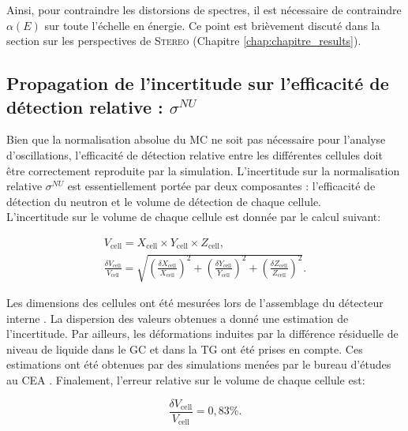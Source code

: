 \bigbreak

Ainsi, pour contraindre les distorsions de spectres, il est nécessaire de contraindre $\alpha (E)$ sur toute l'échelle en énergie. Ce point est brièvement discuté dans la section sur les perspectives de \textsc{Stereo} (Chapitre \ref{chap:chapitre_results}).

\bigbreak

\subsection{Propagation de l'incertitude sur l'efficacité de détection relative : $\sigma^{NU}$}

Bien que la normalisation absolue du MC ne soit pas nécessaire pour l'analyse d'oscillations, l'efficacité de détection relative entre les différentes cellules doit être correctement reproduite par la simulation. L'incertitude sur la normalisation relative $\sigma^{NU}$ est essentiellement portée par deux composantes : l'efficacité de détection du neutron et le volume de détection de chaque cellule.\\

L'incertitude sur le volume de chaque cellule est donnée par le calcul suivant:

\begin{equation}
\begin{gathered}
    V_\textrm{cell} = X_\textrm{cell} \times Y_\textrm{cell} \times Z_\textrm{cell},\\
    \frac{\delta V_\textrm{cell}}{V_\textrm{cell}} = \sqrt{\left(\frac{\delta X_\textrm{cell}}{X_\textrm{cell}}\right)^2 + \left(\frac{\delta Y_\textrm{cell}}{Y_\textrm{cell}}\right)^2 + \left(\frac{\delta Z_\textrm{cell}}{Z_\textrm{cell}}\right)^2}.
\end{gathered}
\end{equation}

\bigbreak

Les dimensions des cellules ont été mesurées lors de l'assemblage du détecteur interne \cite{docdb469}. La dispersion des valeurs obtenues a donné une estimation de l'incertitude. Par ailleurs, les déformations induites par la différence résiduelle de niveau de liquide dans le GC et dans la TG ont été prises en compte. Ces estimations ont été obtenues par des simulations menées par le bureau d'études au CEA \cite{docdb149}. Finalement, l'erreur relative sur le volume de chaque cellule est:

\begin{equation}
    \frac{\delta V_\textrm{cell}}{V_\textrm{cell}} = 0,83\%.
\end{equation}

